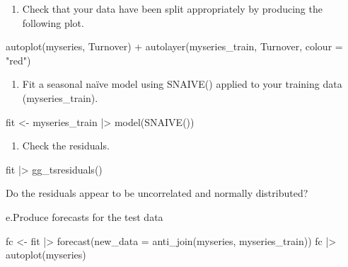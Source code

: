 \documentclass[
  11pt,
]{article}
\newenvironment{Shaded}{\begin{snugshade}}{\end{snugshade}}
\newcommand{\NormalTok}[1]{\textcolor[rgb]{0.00,0.23,0.31}{#1}}
\providecommand{\tightlist}{%
  \setlength{\itemsep}{0pt}\setlength{\parskip}{0pt}}\usepackage{longtable,booktabs,array}
\begin{document}
\begin{enumerate}
\def\labelenumi{\alph{enumi}.}
\setcounter{enumi}{1}
\tightlist
\item
  Check that your data have been split appropriately by producing the
  following plot.
\end{enumerate}

\begin{Shaded}
\begin{Highlighting}[]
\NormalTok{autoplot(myseries, Turnover) +}
\NormalTok{  autolayer(myseries\_train, Turnover, colour = "red")}
\end{Highlighting}
\end{Shaded}

\begin{enumerate}
\def\labelenumi{\alph{enumi}.}
\setcounter{enumi}{2}
\tightlist
\item
  Fit a seasonal naïve model using SNAIVE() applied to your training
  data (myseries\_train).
\end{enumerate}

\begin{Shaded}
\begin{Highlighting}[]
\NormalTok{fit \textless{}{-} myseries\_train |\textgreater{}}
\NormalTok{  model(SNAIVE())}
\end{Highlighting}
\end{Shaded}

\begin{enumerate}
\def\labelenumi{\alph{enumi}.}
\setcounter{enumi}{3}
\tightlist
\item
  Check the residuals.
\end{enumerate}

\begin{Shaded}
\begin{Highlighting}[]
\NormalTok{fit |\textgreater{} gg\_tsresiduals()}
\end{Highlighting}
\end{Shaded}

Do the residuals appear to be uncorrelated and normally distributed?

e.Produce forecasts for the test data

\begin{Shaded}
\begin{Highlighting}[]
\NormalTok{fc \textless{}{-} fit |\textgreater{}}
\NormalTok{  forecast(new\_data = anti\_join(myseries, myseries\_train))}
\NormalTok{fc |\textgreater{} autoplot(myseries)}
\end{Highlighting}
\end{Shaded}
\end{document}
